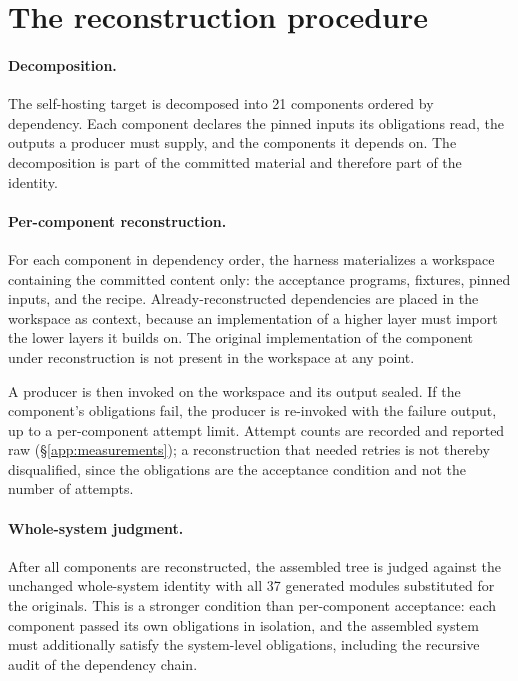 \appendix
\onecolumn

\section{The reconstruction procedure}
\label{app:procedure}

\paragraph{Decomposition.} The self-hosting target is decomposed into 21
components ordered by dependency. Each component declares the pinned
inputs its obligations read, the outputs a producer must supply, and the
components it depends on. The decomposition is part of the committed
material and therefore part of the identity.

\paragraph{Per-component reconstruction.} For each component in
dependency order, the harness materializes a workspace containing the
committed content only: the acceptance programs, fixtures, pinned
inputs, and the recipe. Already-reconstructed dependencies are placed in
the workspace as context, because an implementation of a higher layer
must import the lower layers it builds on. The original implementation
of the component under reconstruction is not present in the workspace at
any point.

A producer is then invoked on the workspace and its output sealed. If the
component's obligations fail, the producer is re-invoked with the failure
output, up to a per-component attempt limit. Attempt counts are recorded
and reported raw (\S\ref{app:measurements}); a reconstruction that needed
retries is not thereby disqualified, since the obligations are the
acceptance condition and not the number of attempts.

\paragraph{Whole-system judgment.} After all components are
reconstructed, the assembled tree is judged against the unchanged
whole-system identity with all 37 generated modules substituted for the
originals. This is a stronger condition than per-component acceptance:
each component passed its own obligations in isolation, and the assembled
system must additionally satisfy the system-level obligations, including
the recursive audit of the dependency chain.

